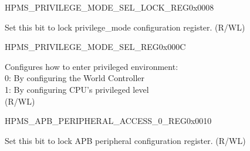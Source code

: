 

\begin{register}{H}{PMS\_PRIVILEGE\_MODE\_SEL\_LOCK\_REG}{0x0008}\label{regdesc:PMSPRIVILEGEMODESELLOCKREG}
%
%
\regnewline%
\begin{regdesc}\begin{reglist}
\label{fielddesc:PMSPRIVILEGEMODESELLOCK}\item [PMS\_PRIVILEGE\_MODE\_SEL\_LOCK] Set this bit to lock privilege\_mode configuration register. (R/WL)
\end{reglist}\end{regdesc}
\end{register}


\begin{register}{H}{PMS\_PRIVILEGE\_MODE\_SEL\_REG}{0x000C}\label{regdesc:PMSPRIVILEGEMODESELREG}
%
%
\regnewline%
\begin{regdesc}\begin{reglist}
\label{fielddesc:PMSPRIVILEGEMODESEL}\item [PMS\_PRIVILEGE\_MODE\_SEL] Configures how to enter privileged environment:\\
0: By configuring the World Controller\\
1: By configuring CPU's privileged level\\
(R/WL)
\end{reglist}\end{regdesc}
\end{register}


\begin{register}{H}{PMS\_APB\_PERIPHERAL\_ACCESS\_0\_REG}{0x0010}\label{regdesc:PMSAPBPERIPHERALACCESS0REG}
%
%
\regnewline%
\begin{regdesc}\begin{reglist}
\label{fielddesc:PMSAPBPERIPHERALACCESSLOCK}\item [PMS\_APB\_PERIPHERAL\_ACCESS\_LOCK] Set this bit to lock APB peripheral configuration register. (R/WL)
\end{reglist}\end{regdesc}
\end{register}


